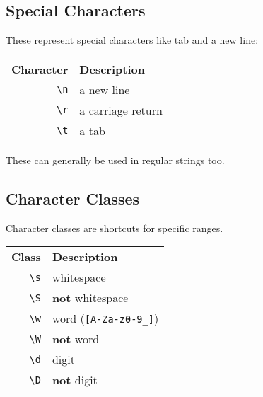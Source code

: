 \subsection{Special Characters}

These represent special characters like tab and a new line:
\\

\begin{small}
    \begin{tabu}{r X}
        \textbf{Character}          & \textbf{Description} \\
        \texttt{\textbackslash n}          & a new line \\
        \texttt{\textbackslash r}          & a carriage return \\
        \texttt{\textbackslash t}          & a tab \\
    \end{tabu}
\end{small}

\par\bigskip

These can generally be used in regular strings too.

\subsection{Character Classes}

Character classes are shortcuts for specific ranges.
\\

\begin{small}
    \begin{tabu}{r X}
        \textbf{Class}      & \textbf{Description} \\
        \texttt{\textbackslash s}         & whitespace \\
        \texttt{\textbackslash S}         & \textbf{not} whitespace \\
        \texttt{\textbackslash w}         & word (\texttt{[A-Za-z0-9\_]}) \\
        \texttt{\textbackslash W}         & \textbf{not} word \\
        \texttt{\textbackslash d}         & digit \\
        \texttt{\textbackslash D}         & \textbf{not} digit
    \end{tabu}
\end{small}

\par\bigskip


